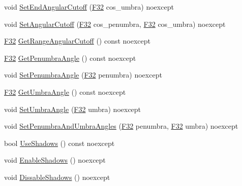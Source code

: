 \begin{DoxyCompactItemize}
void \hyperlink{classmage_1_1rendering_1_1_spot_light_a39c94841a3f839dd05f387fc87722f00}{Set\+End\+Angular\+Cutoff} (\hyperlink{namespacemage_aa97e833b45f06d60a0a9c4fc22ae02c0}{F32} cos\+\_\+umbra) noexcept
\item 
void \hyperlink{classmage_1_1rendering_1_1_spot_light_a92a3b92e8a789c038c0f9058b1ff5a48}{Set\+Angular\+Cutoff} (\hyperlink{namespacemage_aa97e833b45f06d60a0a9c4fc22ae02c0}{F32} cos\+\_\+penumbra, \hyperlink{namespacemage_aa97e833b45f06d60a0a9c4fc22ae02c0}{F32} cos\+\_\+umbra) noexcept
\item 
\hyperlink{namespacemage_aa97e833b45f06d60a0a9c4fc22ae02c0}{F32} \hyperlink{classmage_1_1rendering_1_1_spot_light_abd442757ce094619b8f4c050e54403e1}{Get\+Range\+Angular\+Cutoff} () const noexcept
\item 
\hyperlink{namespacemage_aa97e833b45f06d60a0a9c4fc22ae02c0}{F32} \hyperlink{classmage_1_1rendering_1_1_spot_light_a17d63e6f944d83eaca821476de70d5bc}{Get\+Penumbra\+Angle} () const noexcept
\item 
void \hyperlink{classmage_1_1rendering_1_1_spot_light_a8dac22c53c71001a6c43ab2a34ace206}{Set\+Penumbra\+Angle} (\hyperlink{namespacemage_aa97e833b45f06d60a0a9c4fc22ae02c0}{F32} penumbra) noexcept
\item 
\hyperlink{namespacemage_aa97e833b45f06d60a0a9c4fc22ae02c0}{F32} \hyperlink{classmage_1_1rendering_1_1_spot_light_a2ad4020c60fcfd2fca7568fbefa601f0}{Get\+Umbra\+Angle} () const noexcept
\item 
void \hyperlink{classmage_1_1rendering_1_1_spot_light_a65c753804a53c6b9fc1c58bf036a75c1}{Set\+Umbra\+Angle} (\hyperlink{namespacemage_aa97e833b45f06d60a0a9c4fc22ae02c0}{F32} umbra) noexcept
\item 
void \hyperlink{classmage_1_1rendering_1_1_spot_light_aa2e2c75dabaf5d33141d9b8a1163f317}{Set\+Penumbra\+And\+Umbra\+Angles} (\hyperlink{namespacemage_aa97e833b45f06d60a0a9c4fc22ae02c0}{F32} penumbra, \hyperlink{namespacemage_aa97e833b45f06d60a0a9c4fc22ae02c0}{F32} umbra) noexcept
\item 
bool \hyperlink{classmage_1_1rendering_1_1_spot_light_a5081e3b99bd869d6c241b48666917cd4}{Use\+Shadows} () const noexcept
\item 
void \hyperlink{classmage_1_1rendering_1_1_spot_light_ace198989b91c5b4ca590dabef5b88e25}{Enable\+Shadows} () noexcept
\item 
void \hyperlink{classmage_1_1rendering_1_1_spot_light_a11897283e223ed345a2d04738e7fc267}{Dissable\+Shadows} () noexcept
\item 

\end{DoxyCompactItemize}
